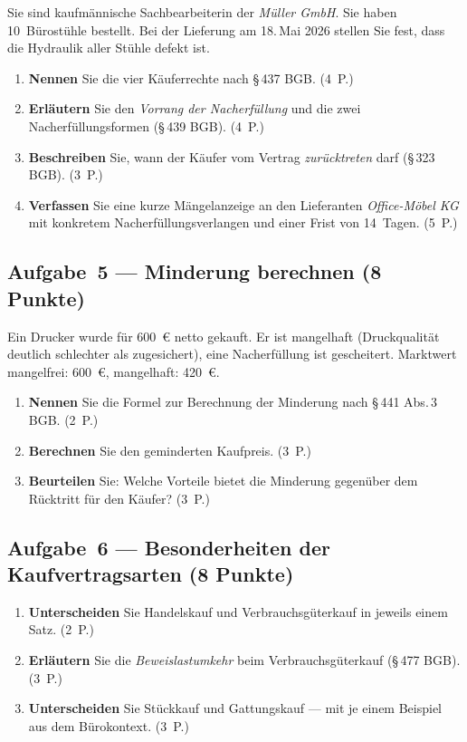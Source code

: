 \documentclass[11pt, a4paper]{article}
\begin{document}
\medskip
Sie sind kaufmännische Sachbearbeiterin der \emph{Müller GmbH}. Sie haben 10~Bürostühle
bestellt. Bei der Lieferung am 18.\,Mai 2026 stellen Sie fest, dass die Hydraulik aller
Stühle defekt ist.

\begin{enumerate}[label=(\alph*)]
  \item \textbf{Nennen} Sie die vier Käuferrechte nach §\,437 BGB. \hfill (4~P.)
  \item \textbf{Erläutern} Sie den \emph{Vorrang der Nacherfüllung} und die zwei Nacherfüllungsformen (§\,439 BGB). \hfill (4~P.)
  \item \textbf{Beschreiben} Sie, wann der Käufer vom Vertrag \emph{zurücktreten} darf (§\,323 BGB). \hfill (3~P.)
  \item \textbf{Verfassen} Sie eine kurze Mängelanzeige an den Lieferanten \emph{Office-Möbel KG} mit konkretem Nacherfüllungsverlangen und einer Frist von 14~Tagen. \hfill (5~P.)
\end{enumerate}

\subsection*{Aufgabe~5 --- Minderung berechnen (8 Punkte)}

Ein Drucker wurde für 600~€ netto gekauft. Er ist mangelhaft (Druckqualität deutlich
schlechter als zugesichert), eine Nacherfüllung ist gescheitert. Marktwert mangelfrei:
600~€, mangelhaft: 420~€.

\begin{enumerate}[label=(\alph*)]
  \item \textbf{Nennen} Sie die Formel zur Berechnung der Minderung nach §\,441 Abs.\,3 BGB. \hfill (2~P.)
  \item \textbf{Berechnen} Sie den geminderten Kaufpreis. \hfill (3~P.)
  \item \textbf{Beurteilen} Sie: Welche Vorteile bietet die Minderung gegenüber dem Rücktritt für den Käufer? \hfill (3~P.)
\end{enumerate}

\subsection*{Aufgabe~6 --- Besonderheiten der Kaufvertragsarten (8 Punkte)}

\begin{enumerate}[label=(\alph*)]
  \item \textbf{Unterscheiden} Sie Handelskauf und Verbrauchsgüterkauf in jeweils einem Satz. \hfill (2~P.)
  \item \textbf{Erläutern} Sie die \emph{Beweislastumkehr} beim Verbrauchsgüterkauf (§\,477 BGB). \hfill (3~P.)
  \item \textbf{Unterscheiden} Sie Stückkauf und Gattungskauf --- mit je einem Beispiel aus dem Bürokontext. \hfill (3~P.)
\end{enumerate}
\end{document}
